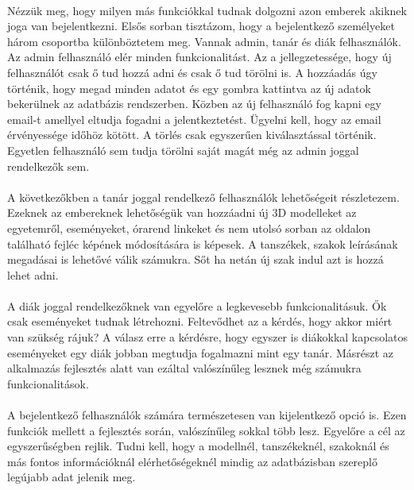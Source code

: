 \documentclass{article}
\begin{document}
	\paragraph{}
	Nézzük meg, hogy milyen más funkciókkal tudnak dolgozni azon emberek akiknek joga van bejelentkezni. Elsős sorban tisztázom, hogy a bejelentkező személyeket három csoportba különböztetem meg. Vannak admin, tanár és diák felhasználók. Az admin felhasználó elér minden funkcionalitást. Az a jellegzetessége, hogy új felhasználót csak ő tud hozzá adni és csak ő tud törölni is. A hozzáadás úgy történik, hogy megad minden adatot és egy gombra kattintva az új adatok bekerülnek az adatbázis rendszerben. Közben az új felhasználó fog kapni egy email-t amellyel eltudja fogadni a jelentkeztetést. Ügyelni kell, hogy az email érvényessége időhöz kötött. A törlés csak egyszerűen kiválasztással történik. Egyetlen felhasználó sem tudja törölni saját magát még az admin joggal rendelkezők sem.
	\paragraph{}
	A következőkben a tanár joggal rendelkező felhasználók lehetőségeit részletezem. Ezeknek az embereknek lehetőségük van hozzáadni új 3D modelleket az egyetemről, eseményeket, órarend linkeket és nem utolsó sorban az oldalon található fejléc képének módosítására is képesek. A tanszékek, szakok leírásának megadásai is lehetővé válik számukra. Sőt ha netán új szak indul azt is hozzá lehet adni.
	\paragraph{}
	A diák joggal rendelkezőknek van egyelőre a legkevesebb funkcionalitásuk. Ők csak eseményeket tudnak létrehozni. Feltevődhet az a kérdés, hogy akkor miért van szükség rájuk? A válasz erre a kérdésre, hogy egyszer is diákokkal kapcsolatos eseményeket egy diák jobban megtudja fogalmazni mint egy tanár. Másrészt az alkalmazás fejlesztés alatt van ezáltal valószínűleg lesznek még számukra funkcionalitások. 
	\paragraph{}
	A bejelentkező felhasználók számára természetesen van kijelentkező opció is. Ezen funkciók mellett a fejlesztés során, valószínűleg sokkal több lesz. Egyelőre a cél az egyszerűségben rejlik. Tudni kell, hogy a modellnél, tanszékeknél, szakoknál és más fontos információknál elérhetőségeknél mindig az adatbázisban szereplő legújabb adat jelenik meg. 
\end{document}
